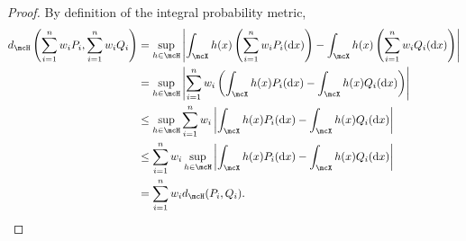 \begin{proof}
	By definition of the integral probability metric,
	\begin{align}
		{d_{\mcH}\left(\sum_{i=1}^{n}w_i P_i, \sum_{i=1}^{n}w_iQ_i\right)}
		 & =  \sup_{h \in \mcH}\left\vert \int_{\mcX} h(x) \left(\sum_{i=1}^{n}w_i P_i(\dee x)\right) - \int_{\mcX} h(x)\left(\sum_{i=1}^{n}w_i Q_i(\dee x)\right)\right\vert  \nonumber \\
		 & = \sup_{h \in \mcH}\left\vert \sum_{i=1}^{n}w_i \left(\int_{\mcX} h(x)  P_i(\dee x) - \int_{\mcX} h(x) Q_i(\dee x) \right)\right\vert\nonumber                                \\
		 & \le  \sup_{h \in \mcH} \sum_{i=1}^{n}w_i \left\vert  \int_{\mcX} h(x) P_i(\dee x) - \int_{\mcX} h(x) Q_i(\dee x) \right\vert \nonumber                                        \\
		 & \le \sum_{i=1}^{n}w_i  \sup_{h \in \mcH} \left\vert  \int_{\mcX} h(x) P_i(\dee x) - \int_{\mcX} h(x) Q_i(\dee x) \right\vert  \nonumber                                       \\
		 & = \sum_{i=1}^{n}w_i  d_{\mcH} (P_i, Q_i).
	\end{align}
\end{proof}



